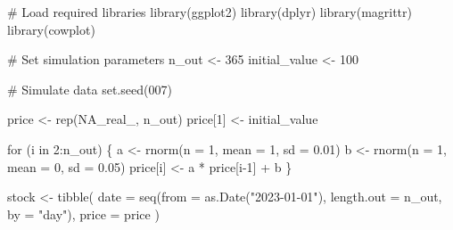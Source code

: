 \documentclass[
  letterpaper,
  DIV=11,
  numbers=noendperiod]{scrreprt}
\newenvironment{Shaded}{\begin{snugshade}}{\end{snugshade}}
\newcommand{\AttributeTok}[1]{\textcolor[rgb]{0.40,0.45,0.13}{#1}}
\newcommand{\CommentTok}[1]{\textcolor[rgb]{0.37,0.37,0.37}{#1}}
\newcommand{\ConstantTok}[1]{\textcolor[rgb]{0.56,0.35,0.01}{#1}}
\newcommand{\ControlFlowTok}[1]{\textcolor[rgb]{0.00,0.23,0.31}{#1}}
\newcommand{\DecValTok}[1]{\textcolor[rgb]{0.68,0.00,0.00}{#1}}
\newcommand{\FloatTok}[1]{\textcolor[rgb]{0.68,0.00,0.00}{#1}}
\newcommand{\FunctionTok}[1]{\textcolor[rgb]{0.28,0.35,0.67}{#1}}
\newcommand{\NormalTok}[1]{\textcolor[rgb]{0.00,0.23,0.31}{#1}}
\newcommand{\OtherTok}[1]{\textcolor[rgb]{0.00,0.23,0.31}{#1}}
\newcommand{\SpecialCharTok}[1]{\textcolor[rgb]{0.37,0.37,0.37}{#1}}
\newcommand{\StringTok}[1]{\textcolor[rgb]{0.13,0.47,0.30}{#1}}
\begin{document}
\begin{Shaded}
\begin{Highlighting}[]
\CommentTok{\# Load required libraries}
\FunctionTok{library}\NormalTok{(ggplot2)}
\FunctionTok{library}\NormalTok{(dplyr)}
\FunctionTok{library}\NormalTok{(magrittr)}
\FunctionTok{library}\NormalTok{(cowplot)}

\CommentTok{\# Set simulation parameters}
\NormalTok{n\_out }\OtherTok{\textless{}{-}} \DecValTok{365} 
\NormalTok{initial\_value }\OtherTok{\textless{}{-}} \DecValTok{100}

\CommentTok{\# Simulate data}
\FunctionTok{set.seed}\NormalTok{(}\DecValTok{007}\NormalTok{)}

\NormalTok{price }\OtherTok{\textless{}{-}} \FunctionTok{rep}\NormalTok{(}\ConstantTok{NA\_real\_}\NormalTok{, n\_out)}
\NormalTok{price[}\DecValTok{1}\NormalTok{] }\OtherTok{\textless{}{-}}\NormalTok{ initial\_value}

\ControlFlowTok{for}\NormalTok{ (i }\ControlFlowTok{in} \DecValTok{2}\SpecialCharTok{:}\NormalTok{n\_out) \{}
\NormalTok{  a }\OtherTok{\textless{}{-}} \FunctionTok{rnorm}\NormalTok{(}\AttributeTok{n =} \DecValTok{1}\NormalTok{, }\AttributeTok{mean =} \DecValTok{1}\NormalTok{, }\AttributeTok{sd =} \FloatTok{0.01}\NormalTok{)}
\NormalTok{  b }\OtherTok{\textless{}{-}} \FunctionTok{rnorm}\NormalTok{(}\AttributeTok{n =} \DecValTok{1}\NormalTok{, }\AttributeTok{mean =} \DecValTok{0}\NormalTok{, }\AttributeTok{sd =} \FloatTok{0.05}\NormalTok{)}
\NormalTok{  price[i] }\OtherTok{\textless{}{-}}\NormalTok{ a }\SpecialCharTok{*}\NormalTok{ price[i}\DecValTok{{-}1}\NormalTok{] }\SpecialCharTok{+}\NormalTok{ b}
\NormalTok{\}}

\NormalTok{stock }\OtherTok{\textless{}{-}} \FunctionTok{tibble}\NormalTok{(}
  \AttributeTok{date =} \FunctionTok{seq}\NormalTok{(}\AttributeTok{from =} \FunctionTok{as.Date}\NormalTok{(}\StringTok{"2023{-}01{-}01"}\NormalTok{), }\AttributeTok{length.out =}\NormalTok{ n\_out, }\AttributeTok{by =} \StringTok{"day"}\NormalTok{),}
  \AttributeTok{price =}\NormalTok{ price}
\NormalTok{)}


\end{Highlighting}
\end{Shaded}
\end{document}

